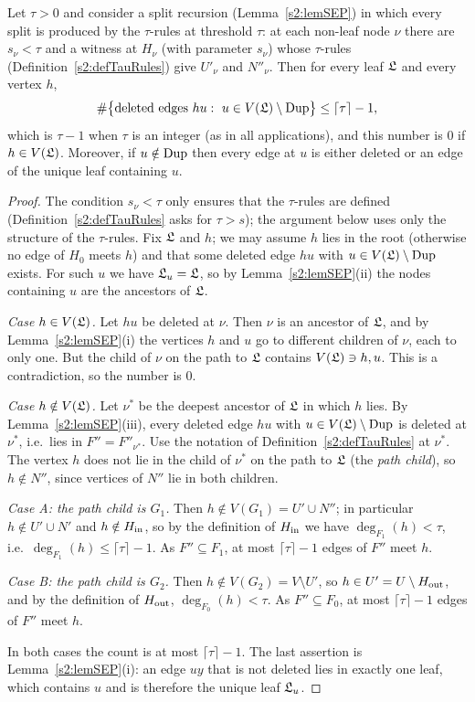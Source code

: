 \begin{lemma}\label{s2:lemThinCut}
Let $\tau>0$ and consider a split recursion (Lemma~\ref{s2:lemSEP}) in which
every split is produced by the $\tau$-rules at threshold $\tau$: at each
non-leaf node $\nu$ there are $s_\nu<\tau$ and a witness at $H_\nu$ (with
parameter $s_\nu$) whose $\tau$-rules (Definition~\ref{s2:defTauRules}) give
$U'_\nu$ and $N''_\nu$. Then for every leaf $\mathfrak{L}$ and every vertex $h$,
\[
\#\bigl\{\text{deleted edges } hu:\ u\in V(\mathfrak{L})\setminus\mathrm{Dup}\bigr\}\le
\lceil\tau\rceil-1,
\]
which is $\tau-1$ when $\tau$ is an integer (as in all applications), and this
number is $0$ if $h\in V(\mathfrak{L})$. Moreover, if $u\notin\mathrm{Dup}$ then
every edge at $u$ is either deleted or an edge of the unique leaf containing
$u$.
\deps{\ref{s2:lemSEP}, \ref{s2:defTauRules}}
\end{lemma}

\begin{proof}
The condition $s_\nu<\tau$ only ensures that the $\tau$-rules are defined
(Definition~\ref{s2:defTauRules} asks for $\tau>s$); the argument below uses only
the structure of the $\tau$-rules.
Fix $\mathfrak{L}$ and $h$; we may assume $h$ lies in the root (otherwise no edge
of $H_0$ meets $h$) and that some deleted
edge $hu$ with $u\in V(\mathfrak{L})\setminus\mathrm{Dup}$ exists. For such $u$ we have
$\mathfrak{L}_u=\mathfrak{L}$, so by Lemma~\ref{s2:lemSEP}(ii) the nodes containing $u$ are
the ancestors of $\mathfrak{L}$.

\emph{Case $h\in V(\mathfrak{L})$.} Let $hu$ be deleted at $\nu$. Then $\nu$ is an
ancestor of $\mathfrak{L}$, and by Lemma~\ref{s2:lemSEP}(i) the vertices $h$ and $u$
go to different children of $\nu$, each to only one. But the child of $\nu$ on
the path to $\mathfrak{L}$ contains $V(\mathfrak{L})\ni h,u$. This is a contradiction, so
the number is $0$.

\emph{Case $h\notin V(\mathfrak{L})$.} Let $\nu^*$ be the deepest ancestor of
$\mathfrak{L}$ in which $h$ lies. By Lemma~\ref{s2:lemSEP}(iii), every deleted edge
$hu$ with $u\in V(\mathfrak{L})\setminus\mathrm{Dup}$ is deleted at $\nu^*$, i.e.\ lies in
$F''=F''_{\nu^*}$. Use the notation of Definition~\ref{s2:defTauRules} at
$\nu^*$. The vertex $h$ does not lie in the child of $\nu^*$ on the path to
$\mathfrak{L}$ (the \emph{path child}), so $h\notin N''$, since vertices of $N''$ lie
in both children.

\emph{Case A: the path child is $G_1$.} Then $h\notin V(G_1)=U'\cup N''$; in
particular $h\notin U'\cup N'$ and $h\notin H_{\mathrm{in}}$, so by the definition of
$H_{\mathrm{in}}$ we have $\deg_{F_1}(h)<\tau$, i.e.\ $\deg_{F_1}(h)\le\lceil\tau\rceil-1$.
As $F''\subseteq F_1$, at most $\lceil\tau\rceil-1$ edges of $F''$ meet $h$.

\emph{Case B: the path child is $G_2$.} Then $h\notin V(G_2)=V\setminus U'$,
so $h\in U'=U\setminus H_{\mathrm{out}}$, and by the definition of $H_{\mathrm{out}}$,
$\deg_{F_0}(h)<\tau$. As $F''\subseteq F_0$, at most $\lceil\tau\rceil-1$ edges
of $F''$ meet $h$.

In both cases the count is at most $\lceil\tau\rceil-1$. The last assertion is
Lemma~\ref{s2:lemSEP}(i): an edge $uy$ that is not deleted lies in exactly one
leaf, which contains $u$ and is therefore the unique leaf $\mathfrak{L}_u$.
\end{proof}

